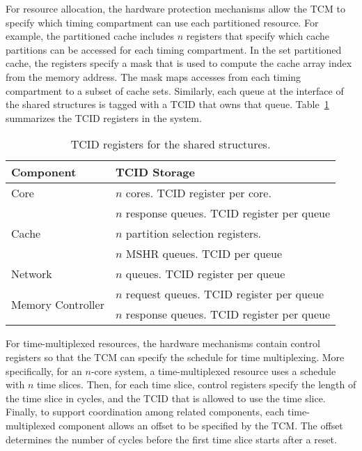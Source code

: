 For resource allocation, the hardware protection mechanisms allow the TCM to 
specify which timing compartment can use each partitioned resource.
For example, 
the partitioned cache includes $n$ registers that specify which cache partitions 
can be accessed for each timing compartment. 
In the set partitioned cache, the registers specify a mask
that is used to compute the cache array index from the memory address.
The mask maps accesses from each timing compartment to a subset of 
cache sets.
Similarly, each queue at the interface of the shared structures is tagged
with a TCID that owns that queue.
Table~\ref{table:tcid} summarizes the TCID registers in the system.

\begin{table}
\begin{center}
    \begin{footnotesize}
\begin{tabular}{l|l}
    \hline
    Component & TCID Storage \\
    \hline
    Core & $n$ cores. TCID register per core. \\
    \hline
    \multirow{3}{*}{Cache}
    & $n$ response queues. TCID register per queue \\
    & $n$ partition selection registers. \\
    & $n$ MSHR queues. TCID per queue\\
    \hline
    Network & $n$ queues. TCID register per queue\\
    \hline
    \multirow{2}{*}{Memory Controller}
    & $n$ request queues. TCID register per queue \\
    & $n$ response queues. TCID register per queue\\
    \hline
\end{tabular}
    \end{footnotesize}
    \caption{TCID registers for the shared structures.}
    \label{table:tcid}
\end{center}
\end{table}

For time-multiplexed resources, the hardware mechanisms contain control
registers so that the TCM can specify the schedule for time multiplexing.
More specifically, for an $n$-core system, a time-multiplexed resource
uses a schedule with $n$ time slices. Then, for each time slice, control
registers specify the length of the time slice in cycles, and
the TCID that is allowed to use the time slice. Finally, to support
coordination among related components, each time-multiplexed component
allows an offset to be specified by the TCM. The offset determines
the number of cycles before the first time slice starts after a reset.

